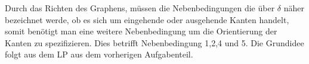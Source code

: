\documentclass[10pt]{article}
\begin{document}
      Durch das Richten des Graphens, müssen die Nebenbedingungen die über
      $\delta$ näher bezeichnet werde, ob es sich um eingehende oder ausgehende
      Kanten handelt, somit benötigt man eine weitere Nebenbedingung um die
      Orientierung der Kanten zu spezifizieren. Dies betrifft Nebenbedingung
      1,2,4 und 5. Die Grundidee folgt aus dem LP aus dem vorherigen
      Aufgabenteil.


%
%
\end{document}
